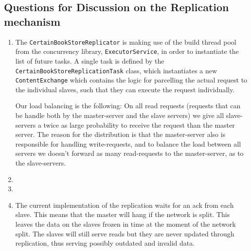 \documentclass[10pt,a4paper]{article}
\begin{document}
\subsection*{Questions for Discussion on the Replication mechanism}
\begin{enumerate}
	\item The \texttt{CertainBookStoreReplicator} is making use of the build thread pool from the concurrency library, \texttt{ExecutorService}, in order to instantiate the list of future tasks. A single task is defined by the \texttt{CertainBookStore\-ReplicationTask} class, which instantiates a new \texttt{ContentExchange} which contains the logic for parcelling the actual request to the individual slaves, such that they can execute the request individually.
	\newline
	
	Our load balancing is the following: On all read requests (requests that can be handle both by the master-server and the slave servers) we give all slave-servers a twice as large probability to receive the request than the master server. The reason for the distribution is that the master-server also is responsible for handling write-requests, and to balance the load between all servers we doesn't forward as many read-requests to the master-server, as to the slave-servers.
	\item
	\item
	\item The current implementation of the replication waits for an ack from each slave. This means that the master will hang if the network is split. This leaves the data on the slaves frozen in time at the moment of the network split. The slaves will still serve reads but they are never updated through replication, thus serving possibly outdated and invalid data.
\end{enumerate}
\end{document}
